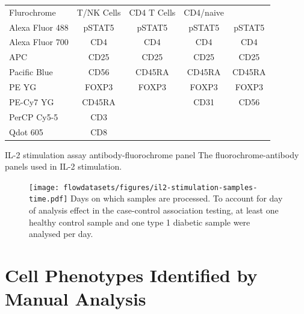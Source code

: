 \begin{table}[h!]\footnotesize
  \centering
\begin{tabularx}{\textwidth}{lcccc}
\rowcolor{Gray}
Flurochrome     & T/NK Cells & CD4 T Cells & CD4/naive \\
Alexa Fluor 488 & pSTAT5 & pSTAT5 & pSTAT5 & pSTAT5  \\
Alexa Fluor 700 & CD4    & CD4    & CD4    & CD4     \\
APC             & CD25   & CD25   & CD25   & CD25    \\
Pacific Blue    & CD56   & CD45RA & CD45RA & CD45RA  \\
PE YG           & FOXP3  & FOXP3  & FOXP3  & FOXP3   \\
PE-Cy7 YG       & CD45RA &        & CD31   & CD56    \\
PerCP Cy5-5     & CD3    &        &        &         \\
Qdot 605        & CD8    &        &        &         \\
\end{tabularx}
{IL-2 stimulation assay antibody-fluorochrome panel}
{
The fluorochrome-antibody panels used in IL-2 stimulation.
}
\end{table}
%
\begin{figure}
\centering
\texttt{[image: flowdatasets/figures/il2-stimulation-samples-time.pdf]}
{ Days on which samples are processed. }
{
  To account for day of analysis effect in the case-control association testing,
  at least one healthy control sample and one type 1 diabetic sample were analysed per day.
}
\end{figure}


\section{Cell Phenotypes Identified by Manual Analysis}

